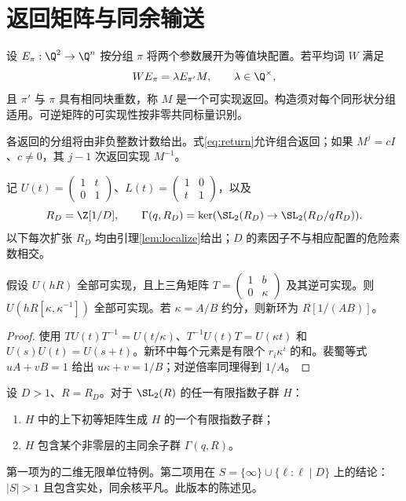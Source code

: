 \section{返回矩阵与同余输送}\label{sec:arithmetic}
\begin{definition}\label{def:return}
设 $E_\pi:\Q^2\to\Q^n$ 按分组 $\pi$ 将两个参数展开为等值块配置。若平均词 $W$ 满足
\begin{equation}\label{eq:return}
WE_\pi=\lambda E_{\pi'}M,\qquad \lambda\in\Q^\times,
\end{equation}
且 $\pi'$ 与 $\pi$ 具有相同块重数，称 $M$ 是一个可实现返回。构造须对每个同形状分组适用。可逆矩阵的可实现性按非零共同标量识别。
\end{definition}
各返回的分组将由非负整数计数给出。式\eqref{eq:return}允许组合返回；如果 $M^j=cI$、$c\ne0$，其 $j-1$ 次返回实现 $M^{-1}$。

记 $U(t)=\left(\begin{smallmatrix}1&t\\0&1\end{smallmatrix}\right)$、$L(t)=\left(\begin{smallmatrix}1&0\\t&1\end{smallmatrix}\right)$，以及
\[
R_D=\Z[1/D],\qquad
\Gamma(q,R_D)=\ker(\SL_2(R_D)\to\SL_2(R_D/qR_D)).
\]
以下每次扩张 $R_D$ 均由引理\ref{lem:localize}给出；$D$ 的素因子不与相应配置的危险素数相交。

\begin{lemma}\label{lem:localize}
假设 $U(hR)$ 全部可实现，且上三角矩阵 $T=\left(\begin{smallmatrix}1&b\\0&\kappa\end{smallmatrix}\right)$ 及其逆可实现。则 $U(hR[\kappa,\kappa^{-1}])$ 全部可实现。若 $\kappa=A/B$ 约分，则新环为 $R[1/(AB)]$。
\end{lemma}
\begin{proof}
使用 $TU(t)T^{-1}=U(t/\kappa)$、$T^{-1}U(t)T=U(\kappa t)$ 和 $U(s)U(t)=U(s+t)$。新环中每个元素是有限个 $r_i\kappa^i$ 的和。裴蜀等式 $uA+vB=1$ 给出 $u\kappa+v=1/B$；对逆倍率同理得到 $1/A$。
\end{proof}

\begin{theorem}\label{thm:arithmetic-external}
设 $D>1$、$R=R_D$。对于 $\SL_2(R)$ 的任一有限指数子群 $H$：
\begin{enumerate}
\item $H$ 中的上下初等矩阵生成 $H$ 的一个有限指数子群；
\item $H$ 包含某个非零层的主同余子群 $\Gamma(q,R)$。
\end{enumerate}
\end{theorem}
第一项为\cite[Theorem 6.1(2)]{morris}的二维无限单位特例。第二项用\cite{serre}在 $S=\{\infty\}\cup\{\ell:\ell\mid D\}$ 上的结论：$|S|>1$ 且包含实处，同余核平凡。此版本的陈述见\cite[pp.308--309, Proposition 1 and Section 2.3]{prasad}。


